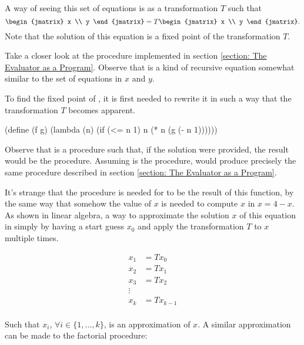   A way of seeing this set of equations is as a transformation $T$ such that \[\begin{jmatrix} x \\ y \end{jmatrix} = T \begin{jmatrix} x \\ y \end{jmatrix}.\] Note that the solution of this equation is a fixed point of the transformation $T$.

  Take a closer look at the  procedure implemented in section \ref{section: The Evaluator as a Program}. Observe that  is a kind of recursive equation somewhat similar to the set of equations in $x$ and $y$.

  To find the fixed point of , it is first needed to rewrite it in such a way that the transformation $T$ becomes apparent.

  \begin{code}
(define (f g)
  (lambda (n)
    (if (<= n 1)
        n
        (* n (g (- n 1))))))
  \end{code}

  Observe that  is a procedure such that, if the solution  were provided, the result would be the  procedure. Assuming  is the  procedure,  would produce precisely the same  procedure described in section \ref{section: The Evaluator as a Program}.

  It's strange that the  procedure is needed for  to be the result of this function, by the same way that somehow the value of $x$ is needed to compute $x$ in $x = 4 - x$. As shown in linear algebra, a way to approximate the solution $x$ of this equation in simply by having a start guess $x_0$ and apply the transformation $T$ to $x$ multiple times.

  \begin{align*}
    x_1 &= T x_0 \\
    x_2 &= T x_1 \\
    x_3 &= T x_2 \\
    \vdots \\
    x_{k} &= T x_{k-1} \\
  \end{align*}

  Such that $x_i$, $\forall i \in \{1, \dots, k\}$, is an approximation of $x$. A similar approximation can be made to the factorial procedure:

